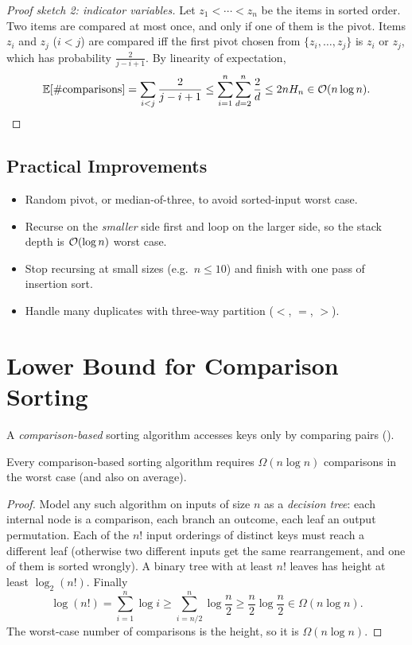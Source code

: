 \begin{proof}[Proof sketch 2: indicator variables]
Let $z_1 < \cdots < z_n$ be the items in sorted order. Two items are compared at
most once, and only if one of them is the pivot. Items $z_i$ and $z_j$ ($i<j$)
are compared iff the first pivot chosen from $\{z_i, \ldots, z_j\}$ is $z_i$ or
$z_j$, which has probability $\frac{2}{j - i + 1}$. By linearity of expectation,
\[
\mathbb E[\#\text{comparisons}] = \sum_{i<j} \frac{2}{j-i+1}
\le \sum_{i=1}^{n} \sum_{d=2}^{n} \frac{2}{d} \le 2n H_n \in \mathcal{O}(n \log n).
\]
\end{proof}

\subsection{Practical Improvements}
\begin{itemize}
  \item Random pivot, or median-of-three, to avoid sorted-input worst case.
  \item Recurse on the \emph{smaller} side first and loop on the larger side, so
        the stack depth is $\mathcal{O}(\log n)$ worst case.
  \item Stop recursing at small sizes (e.g.\ $n \le 10$) and finish with one
        pass of insertion sort.
  \item Handle many duplicates with three-way partition ($<$, $=$, $>$).
\end{itemize}

\section{Lower Bound for Comparison Sorting}

\begin{definition}
A \emph{comparison-based} sorting algorithm accesses keys only by comparing pairs
().
\end{definition}

\begin{theorem}
Every comparison-based sorting algorithm requires $\Omega(n \log n)$ comparisons
in the worst case (and also on average).
\end{theorem}
\begin{proof}
Model any such algorithm on inputs of size $n$ as a \emph{decision tree}: each
internal node is a comparison, each branch an outcome, each leaf an output
permutation. Each of the $n!$ input orderings of distinct keys must reach a
different leaf (otherwise two different inputs get the same rearrangement, and
one of them is sorted wrongly). A binary tree with at least $n!$ leaves has
height at least $\log_2(n!)$. Finally
\[
\log(n!) = \sum_{i=1}^n \log i \ge \sum_{i=n/2}^{n} \log\frac n2
\ge \frac n2 \log \frac n2 \in \Omega(n \log n).
\]
The worst-case number of comparisons is the height, so it is $\Omega(n\log n)$.
\end{proof}

